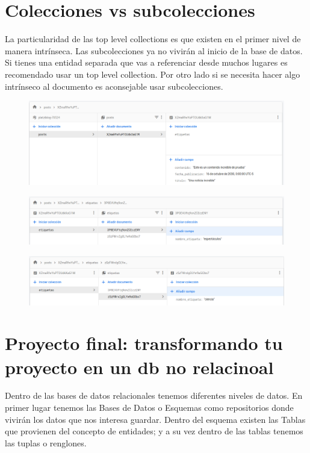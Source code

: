 \documentclass{article}
\begin{document}
\section{Colecciones vs subcolecciones}%
La particularidad de las top level collections es que existen en el primer
nivel de manera intrínseca. Las subcolecciones ya no vivirán al inicio de la
base de datos.\\

Si tienes una entidad separada que vas a referenciar desde muchos lugares es
recomendado usar un top level collection. Por otro lado si se necesita hacer
algo intrínseco al documento es aconsejable usar subcolecciones.\\

\begin{figure}[h!]
  \centering
  \includegraphics[scale=0.5]{./Pictures/176_coleccion_posts.png}
\end{figure}

\begin{figure}[h!]
  \centering
  \includegraphics[scale=0.5]{./Pictures/177_etiqueta_subcoleccion.png}
\end{figure}

\begin{figure}[h!]
  \centering
  \includegraphics[scale=0.5]{./Pictures/178_etiqueta_subcoleccion.png}
\end{figure}


\newpage

\section{Proyecto final: transformando tu proyecto en un db no relacinoal}%
Dentro de las bases de datos relacionales tenemos diferentes niveles de datos.
En primer lugar tenemos las Bases de Datos o Esquemas como repositorios donde
vivirán los datos que nos interesa guardar. Dentro del esquema existen las
Tablas que provienen del concepto de entidades; y a su vez dentro de las tablas
tenemos las tuplas o renglones.\\
\end{document}
